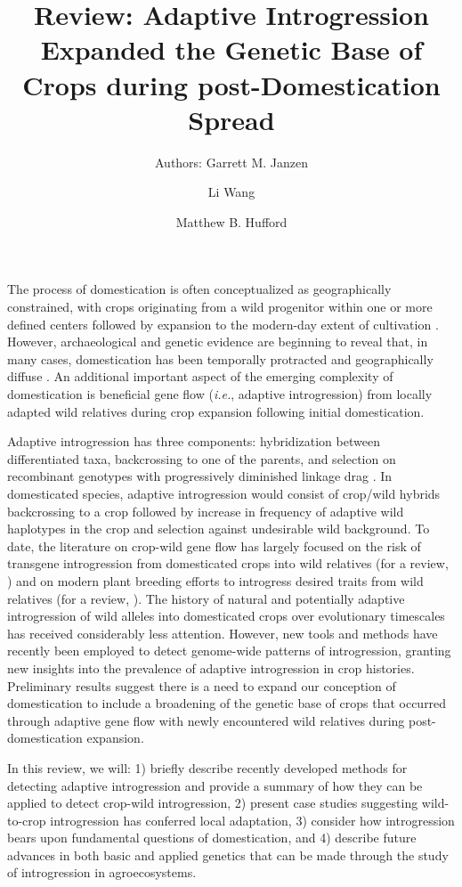\documentclass[11pt]{article}
\title{Review: Adaptive Introgression Expanded the Genetic Base of Crops during post-Domestication Spread}
\author[1]{Authors: Garrett M. Janzen}%
\author[1]{Li Wang}
\author[1,*]{Matthew B. Hufford}
\affil[1]{Department of Ecology, Evolution, and Organismal Biology, Iowa State University, Ames, Iowa, USA}
\affil[*]{Correspondence: mhufford@iastate.edu (M.B. Hufford)}
\date{}
\begin{document}
\maketitle


The process of domestication is often conceptualized as geographically constrained, with crops originating from a wild progenitor within one or more defined centers followed by expansion to the modern-day extent of cultivation \cite{Harlan1992}.
However, archaeological and genetic evidence are beginning to reveal that, in many cases, domestication has been temporally protracted and geographically diffuse \cite{brown2009complex, Meyer2016, wang2017, zhou2017, Fuller2014}.
An additional important aspect of the emerging complexity of domestication is beneficial gene flow (\emph{i.e.}, adaptive introgression) from locally adapted wild relatives during crop expansion following initial domestication.


Adaptive introgression has three components: hybridization between differentiated taxa, backcrossing to one of the parents, and selection on recombinant genotypes with progressively diminished linkage drag \cite{barton2001role, Feuillet200824}.
In domesticated species, adaptive introgression would consist of crop/wild hybrids backcrossing to a crop followed by increase in frequency of adaptive wild haplotypes in the crop and selection against undesirable wild background.
To date, the literature on crop-wild gene flow has largely focused on the risk of transgene introgression from domesticated crops into wild relatives (for a review, \cite{stewart2003transgene}) and on modern plant breeding efforts to introgress desired traits from wild relatives (for a review, \cite{Dempewolf2017}).
The history of natural and potentially adaptive introgression of wild alleles into domesticated crops over evolutionary timescales has received considerably less attention.
However, new tools and methods have recently been employed to detect genome-wide patterns of introgression, granting new insights into the prevalence of adaptive introgression in crop histories.
Preliminary results suggest there is a need to expand our conception of domestication to include a broadening of the genetic base of crops that occurred through adaptive gene flow with newly encountered wild relatives during post-domestication expansion.

In this review, we will: 1) briefly describe recently developed methods for detecting adaptive introgression and provide a summary of how they can be applied to detect crop-wild introgression, 2) present case studies suggesting wild-to-crop introgression has conferred local adaptation, 3) consider how introgression bears upon fundamental questions of domestication, and 4) describe future advances in both basic and applied genetics that can be made through the study of introgression in agroecosystems.
\end{document}
